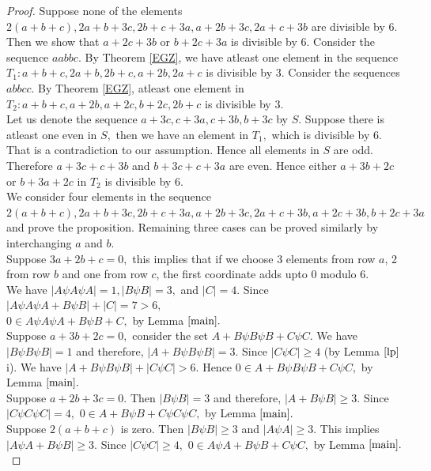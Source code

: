 \documentclass[reqno,10pt]{amsart}
\newtheorem{remar}[prop]{Remark}
\begin{document}
\begin{proof}
Suppose none of the elements $2(a+b+c), 2a+b+3c, 2b+c+3a, a+2b+3c, 2a+c+3b$ are divisible by 6.
Then we show that $a+2c+3b$ or $b+2c+3a$ is divisible by 6. Consider the sequence $aabbc$.  
By Theorem \ref{EGZ}, we have atleast one element in the sequence $T_1 : a+b+c,2a+b,2b+c,a+2b,2a+c$ is divisible by $3.$ Consider the sequences $abbcc$. By Theorem \ref{EGZ}, atleast one element in $T_2 : a+b+c, a+2b,a+2c,b+2c,2b+c$ is divisible by $3.$   
\\
Let us denote the sequence $a+3c,c+3a,c+3b,b+3c$  by $S$. 
Suppose there is atleast one even in $S,$ then we have an element in $T_1,$ which is divisible by $6.$ That is a contradiction to our assumption. Hence all elements in $S$ are odd. Therefore $a+3c + c+3b$ and $b+3c+c+3a$ are even. Hence either $a+3b+2c$ or $b+3a+2c$ in $T_2$ is divisible by $6$.\\ 
We consider four elements in the sequence $2(a+b+c), 2a+b+3c, 2b+c+3a, a+2b+3c, 2a+c+3b,a+2c+3b,b+2c+3a$ and prove the proposition. Remaining three cases can be proved similarly by interchanging $a$ and $b.$
\\
Suppose $3a+2b+c = 0 ,$  this implies that if we choose 3 elements from row $a$, 2 from row $b$ and one from row $c$, the first coordinate adds upto $ 0$ modulo $6.$\\
We have $|A\psi A\psi A|=1,|B\psi B| =3,$  and $|C|=4.$  Since $|A\psi A\psi A+B\psi B|+|C|=7>6,$ \\ $ 0 \in A\psi A\psi A+B\psi B+C,$ by Lemma $\ref{main}.$
\\
Suppose $a+3b+2c = 0,$ consider the set $A+B\psi B\psi B+C\psi C.$ We have $ | B \psi B \psi B| =1  $ and therefore,
$ |A+B \psi B \psi B| = 3. $ Since 
$ |C \psi C|\geq 4$ (by Lemma $\ref{lp}$ i). We have $|A + B \psi B \psi B|+|C\psi C| > 6.$ Hence $0 \in A + B \psi B \psi B+C\psi C,$ by Lemma $\ref{main}.$
\\
 Suppose $a+2b+3c = 0. $ 
 Then  
$ |B \psi B| = 3  $ and therefore, $ |A  + B \psi B| \geq 3 $. Since $ | C \psi C \psi C| = 4  ,$  $ 0 \in A  + B \psi B+ C \psi C \psi C,$ by Lemma $\ref{main}.$
\\
Suppose $2(a+b+c)$ is zero. Then $ |B \psi B| \geq 3  $ and $ |A  \psi A| \geq 3. $ This implies $ |A \psi A  + B \psi B| \geq 3. $ Since $ |C \psi C| \geq 4 ,$  $ 0 \in A \psi A + B \psi B+C \psi C,$ by Lemma $\ref{main}.$
\end{proof}
\end{document}
